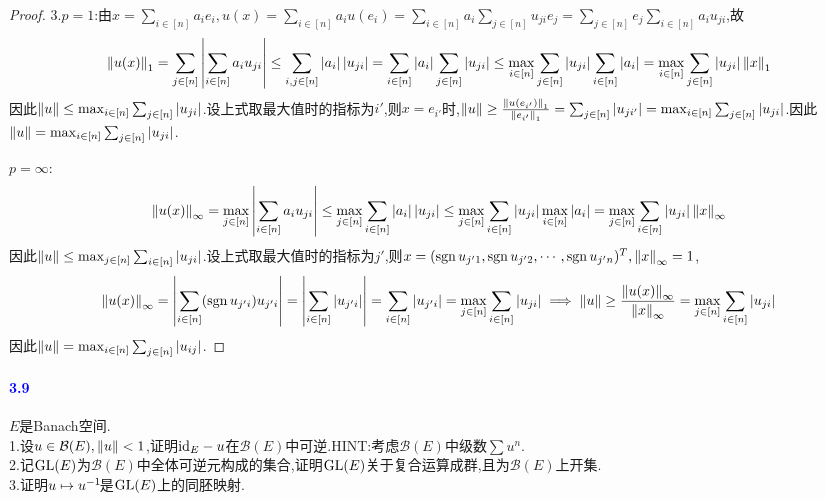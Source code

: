\documentclass[UTF8]{article}
\newcommand{\parablue}[1]{\paragraph*{\textcolor{blue}{#1}}}
\begin{document}
\begin{proof}
    3.$p=1$:由$x=\sum_{i\in [n]}a_ie_i,u(x)=\sum_{i\in [n]}a_iu(e_i)=\sum_{i\in [n]}a_i\sum_{j\in [n]}u_{ji}e_j=\sum_{j\in [n]}e_j\sum_{i\in [n]}a_iu_{ji}$,故$$\left\|u(x)\right\|_1=\sum_{j\in [n]}\left|\sum_{i\in [n]}a_iu_{ji}\right|\leq \sum_{i,j\in [n]}\left|a_i\right|\left|u_{ji}\right|=\sum_{i\in [n]}\left|a_i\right|\sum_{j\in [n]}\left|u_{ji}\right|\leq \max_{i\in [n]}\sum_{j\in [n]}\left|u_{ji}\right|\sum_{i\in [n]}\left|a_i\right|=\max_{i\in [n]}\sum_{j\in [n]}\left|u_{ji}\right|\left\|x\right\|_1$$
    因此$\left\|u\right\|\leq \max_{i\in [n]}\sum_{j\in [n]}\left|u_{ji}\right|$.设上式取最大值时的指标为$i'$,则$x=e_{i'}$时,$\left\|u\right\|\geq \frac{\left\|u(e_{i'})\right\|_1}{\left\|e_{i'}\right\|_1}=\sum_{j\in [n]}\left|u_{ji'}\right|=\max_{i\in [n]}\sum_{j\in [n]}\left|u_{ji}\right|$.因此$\left\|u\right\|=\max_{i\in [n]}\sum_{j\in [n]}\left|u_{ji}\right|$.

    $p=\infty$:$$\left\|u(x)\right\|_\infty=\max_{j\in [n]}\left|\sum_{i\in [n]}a_iu_{ji}\right|\leq \max_{j\in [n]}\sum_{i\in [n]}\left|a_i\right|\left|u_{ji}\right|\leq \max_{j\in [n]}\sum_{i\in [n]}\left|u_{ji}\right|\max_{i\in [n]}\left|a_i\right|=\max_{j\in [n]}\sum_{i\in [n]}\left|u_{ji}\right|\left\|x\right\|_\infty$$
    因此$\left\|u\right\|\leq \max_{j\in [n]}\sum_{i\in [n]}\left|u_{ji}\right|$.设上式取最大值时的指标为$j'$,则$x=(\operatorname{sgn} u_{j'1},\operatorname{sgn} u_{j'2},\cdots,\operatorname{sgn} u_{j'n})^T,\left\|x\right\|_\infty=1$,$$\left\|u(x)\right\|_\infty=\left|\sum_{i\in [n]}(\operatorname{sgn} u_{j'i})u_{j'i}\right|=\left|\sum_{i\in [n]}\left|u_{j'i}\right|\right|=\sum_{i\in [n]}\left|u_{j'i}\right|=\max_{j\in [n]}\sum_{i\in [n]}\left|u_{ji}\right|\implies \left\|u\right\|\geq \frac{\left\|u(x)\right\|_\infty}{\left\|x\right\|_\infty}=\max_{j\in [n]}\sum_{i\in [n]}\left|u_{ji}\right|$$
    因此$\left\|u\right\|=\max_{i\in [n]}\sum_{j\in [n]}\left|u_{ij}\right|$.
\end{proof}

\parablue{3.9}$E$是Banach空间.\\
1.设$u\in \mathcal{B}(E),\left\|u\right\|<1$,证明$\mathrm{id}_E-u$在$\mathcal{B}(E)$中可逆.HINT:考虑$\mathcal{B}(E)$中级数$\sum u^n$.\\
2.记$\operatorname{GL}(E)$为$\mathcal{B}(E)$中全体可逆元构成的集合,证明$\operatorname{GL}(E)$关于复合运算成群,且为$\mathcal{B}(E)$上开集.\\
3.证明$u\mapsto u^{-1}\!$是$\operatorname{GL}(E)$上的同胚映射.
\end{document}
